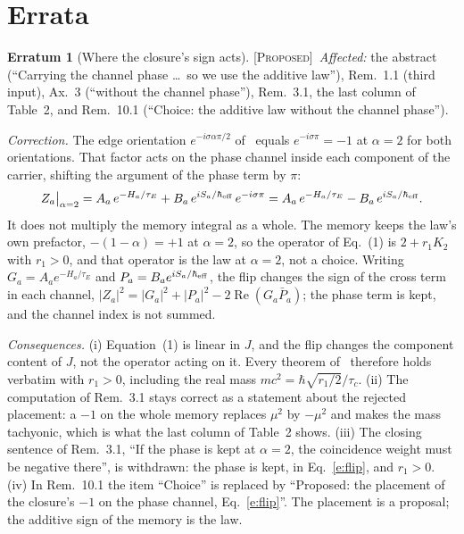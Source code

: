 \documentclass[10pt]{article}
\DeclareMathOperator{\Real}{Re}
\theoremstyle{definition}
\newtheorem{erratum}{Erratum}
\newcommand{\Proposed}{\textup{\textsc{[Proposed]}}\ }
\begin{document}
\section{Errata}\label{s:errata}

\begin{erratum}[Where the closure's sign acts]\label{er:phase}
\Proposed \emph{Affected:} the abstract (``Carrying the channel phase \dots\ so we use the additive law''), Rem.~1.1 (third input), Ax.~3 (``without the channel phase''), Rem.~3.1, the last column of Table~2, and Rem.~10.1 (``Choice: the additive law without the channel phase'').

\emph{Correction.} The edge orientation $e^{-i\sigma\alpha\pi/2}$ of~\cite[Def.~2.3]{edge} equals $e^{-i\sigma\pi}=-1$ at $\alpha=2$ for both orientations. That factor acts on the phase channel inside each component of the carrier, shifting the argument of the phase term by $\pi$:
\begin{equation}\label{e:flip}
Z_a\big|_{\alpha=2}=A_a\,e^{-H_a/\tau_E}+B_a\,e^{iS_a/\hbar_{\rm eff}}\,e^{-i\sigma\pi}=A_a\,e^{-H_a/\tau_E}-B_a\,e^{iS_a/\hbar_{\rm eff}}.
\end{equation}
It does not multiply the memory integral as a whole. The memory keeps the law's own prefactor, $-(1-\alpha)=+1$ at $\alpha=2$, so the operator of Eq.~(1) is $2+r_1K_2$ with $r_1>0$, and that operator is the law at $\alpha=2$, not a choice. Writing $G_a=A_ae^{-H_a/\tau_E}$ and $P_a=B_ae^{iS_a/\hbar_{\rm eff}}$, the flip changes the sign of the cross term in each channel, $|Z_a|^2=|G_a|^2+|P_a|^2-2\Real(G_a\bar P_a)$; the phase term is kept, and the channel index is not summed.

\emph{Consequences.} (i) Equation~(1) is linear in $J$, and the flip changes the component content of $J$, not the operator acting on it. Every theorem of~\cite[\S\S4--8]{feyn} therefore holds verbatim with $r_1>0$, including the real mass $mc^2=\hbar\sqrt{r_1/2}/\tau_c$. (ii) The computation of Rem.~3.1 stays correct as a statement about the rejected placement: a $-1$ on the whole memory replaces $\mu^2$ by $-\mu^2$ and makes the mass tachyonic, which is what the last column of Table~2 shows. (iii) The closing sentence of Rem.~3.1, ``If the phase is kept at $\alpha=2$, the coincidence weight must be negative there'', is withdrawn: the phase is kept, in Eq.~\eqref{e:flip}, and $r_1>0$. (iv) In Rem.~10.1 the item ``Choice'' is replaced by ``Proposed: the placement of the closure's $-1$ on the phase channel, Eq.~\eqref{e:flip}''. The placement is a proposal; the additive sign of the memory is the law.
\end{erratum}
\end{document}
